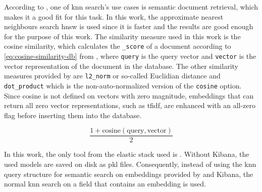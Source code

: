 According to \citeauthor{Elasticsearch-kNN-HNSW}, one of \ac{knn} search's use cases is semantic document retrieval, which makes it a good fit for this task.
In this work, the approximate nearest neighbours search \ac{hnsw} is used since it is faster and the results are good enough for the purpose of this work.
The similarity measure used in this work is the cosine similarity, which calculates the \texttt{\_score} of a document according to \autoref{eq:cosine-similarity-db} from \cite{Elasticsearch-kNN-similarity}, 
where \texttt{query} is the query vector and \texttt{vector} is the vector representation of the document in the database.
The other similarity measures provided by \databaseName{} are \texttt{l2\_norm} or 
so-called Euclidian distance and \texttt{dot\_product} which is the non-auto-normalized version of the \texttt{cosine} option.
Since cosine is not defined on vectors with zero magnitude, embeddings that can return all zero vector representations, such as \ac{tfidf}, 
are enhanced with an all-zero flag before inserting them into the database.

\begin{equation}
    \frac{1 + \text{cosine}(\text{query}, \text{vector})}{2}
    \label{eq:cosine-similarity-db}
\end{equation}

In this work, the only tool from the elastic stack used is \databaseName{}.
Without Kibana, the used models are saved on disk as \ac{pkl} files.
Consequently, instead of using the \ac{knn} query structure for semantic search on embeddings provided by \databaseName{} and Kibana, the normal \ac{knn} search on a field that contains an embedding is used.